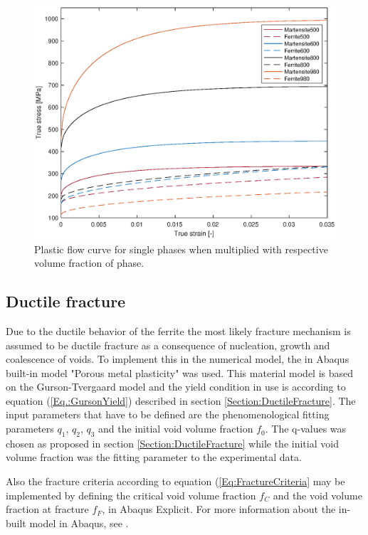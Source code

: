 \documentclass{article}
\begin{document}
\begin{figure}[h!]
    \centering
    \includegraphics[width=\linewidth]{PhaseYieldFrac.eps}
    \caption{Plastic flow curve for single phases when multiplied with respective volume fraction of phase.}
    \label{fig:PhaseYieldFrac}
\end{figure}




\subsection{Ductile fracture}
Due to the ductile behavior of the ferrite the most likely fracture mechanism is assumed to be ductile fracture as a consequence of nucleation, growth and coalescence of voids. To implement this in the numerical model, the in Abaqus built-in model "Porous metal plasticity"  was used. This material model is based on the Gurson-Tvergaard model and the yield condition in use is according to equation (\ref{Eq.:GursonYield}) described in section \ref{Section:DuctileFracture}. The input parameters that have to be defined are the phenomenological fitting parameters $q_1$, $q_2$, $q_3$ and the initial void volume fraction $f_0$. The q-values was chosen as proposed in section \ref{Section:DuctileFracture} while the initial void volume fraction was the fitting parameter to the experimental data.


Also the fracture criteria according to equation (\ref{Eq:FractureCriteria} may be implemented by defining the critical void volume fraction $f_C$ and the void volume fraction at fracture $f_F$, in Abaqus Explicit. For more information about the in-built model in Abaqus, see \cite{UsersManMetalPlast}.
\end{document}
